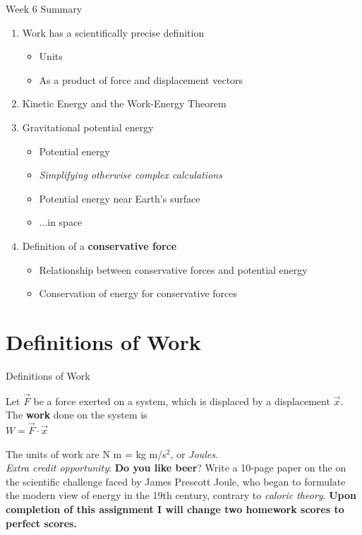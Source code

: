 \documentclass{beamer}
\begin{document}
\begin{frame}{Week 6 Summary}
\begin{enumerate}
\item \alert{Work} has a scientifically precise definition
\begin{itemize}
\item Units
\item As a product of force and displacement vectors
\end{itemize}
\item Kinetic Energy and the \alert{Work-Energy Theorem}
\item Gravitational potential energy
\begin{itemize}
\item Potential energy
\item \textit{Simplifying otherwise complex calculations}
\item Potential energy near Earth's surface
\item ...in space
\end{itemize}
\item Definition of a \textbf{conservative force}
\begin{itemize}
\item Relationship between conservative forces and potential energy
\item Conservation of energy for conservative forces
\end{itemize}
\end{enumerate}
\end{frame}

\section{Definitions of Work}

\begin{frame}{Definitions of Work}
\begin{tcolorbox}[colback=white,colframe=red!40!blue,title=Physical Definition of Work]
\alert{Let $\vec{F}$ be a force exerted on a system, which is displaced by a displacement $\vec{x}$.  The \textbf{work} done on the system is} \\
\alert{$W = \vec{F} \cdot \vec{x}$} \\
\end{tcolorbox}
The units of work are N m = kg m/s$^2$, or \textit{Joules}. \\
\vspace{0.5cm}
\small
\textit{Extra credit opportunity}: \textbf{Do you like beer}?  Write a 10-page paper on the on the scientific challenge faced by James Prescott Joule, who began to formulate the modern view of energy in the 19th century, contrary to \textit{caloric theory}.  \textbf{Upon completion of this assignment I will change two homework scores to perfect scores.}
\end{frame}
\end{document}
